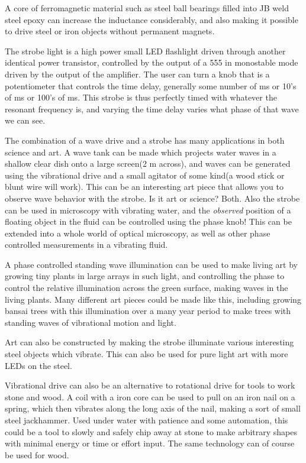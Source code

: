 A core of ferromagnetic material such as steel ball bearings filled into
JB weld steel epoxy can increase the inductance considerably, and also
making it possible to drive steel or iron objects without permanent
magnets.

The strobe light is a high power small LED flashlight driven through
another identical power transistor, controlled by the output of a 555 in
monostable mode driven by the output of the amplifier. The user can turn
a knob that is a potentiometer that controls the time delay, generally
some number of ms or 10's of ms or 100's of ms. This strobe is thus
perfectly timed with whatever the resonant frequency is, and varying the
time delay varies what phase of that wave we can see.

The combination of a wave drive and a strobe has many applications in
both science and art. A wave tank can be made which projects water waves
in a shallow clear dish onto a large screen(2 m across), and waves can
be generated using the vibrational drive and a small agitator of some
kind(a wood stick or blunt wire will work). This can be an interesting
art piece that allows you to observe wave behavior with the strobe. Is
it art or science? Both. Also the strobe can be used in microscopy with
vibrating water, and the \emph{observed} position of a floating object
in the fluid can be controlled using the phase knob! This can be
extended into a whole world of optical microscopy, as well as other
phase controlled measurements in a vibrating fluid.

A phase controlled standing wave illumination can be used to make living
art by growing tiny plants in large arrays in such light, and
controlling the phase to control the relative illumination across the
green surface, making waves in the living plants. Many different art
pieces could be made like this, including growing bansai trees with this
illumination over a many year period to make trees with standing waves
of vibrational motion and light.

Art can also be constructed by making the strobe illuminate various
interesting steel objects which vibrate. This can also be used for pure
light art with more LEDs on the steel.

Vibrational drive can also be an alternative to rotational drive for
tools to work stone and wood. A coil with a iron core can be used to
pull on an iron nail on a spring, which then vibrates along the long
axis of the nail, making a sort of small steel jackhammer. Used under
water with patience and some automation, this could be a tool to slowly
and safely chip away at stone to make arbitrary shapes with minimal
energy or time or effort input. The same technology can of course be
used for wood.

